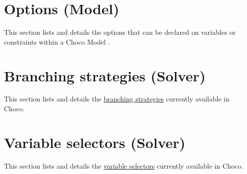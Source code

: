 \chapter{Options (Model)}\label{ch:options}\hypertarget{ch:options}{}
This section lists and details the options that can be declared on variables or constraints within a Choco Model .


\chapter{Branching strategies (Solver)}\label{solver:branchstrat}\hypertarget{solver:branchstrat}{}
This section lists and details the \hyperlink{solver:searchstrategy}{branching strategies} currently available in Choco.













\chapter{Variable selectors (Solver)}\label{ch:varsel}\hypertarget{ch:varsel}{}
This section lists and details the \hyperlink{solver:variableselector}{variable selectors} currently available in Choco.





















